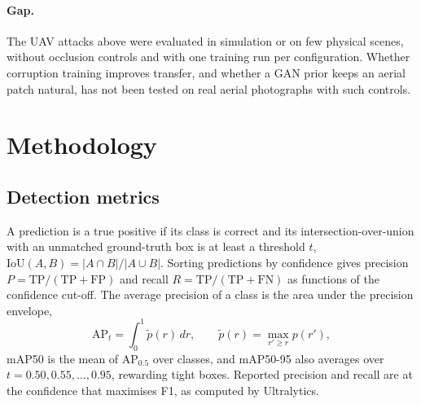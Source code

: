 \documentclass[11pt,a4paper]{article}
\begin{document}
\paragraph{Gap.} The UAV attacks above were evaluated in simulation or on few physical scenes, without occlusion controls and with one training run per configuration. Whether corruption training improves transfer, and whether a GAN prior keeps an aerial patch natural, has not been tested on real aerial photographs with such controls.

\section{Methodology}\label{sec:method}

\subsection{Detection metrics}\label{sec:metrics}
A prediction is a true positive if its class is correct and its intersection-over-union with an unmatched ground-truth box is at least a threshold $t$, $\mathrm{IoU}(A,B)=|A\cap B|/|A\cup B|$. Sorting predictions by confidence gives precision $P=\mathrm{TP}/(\mathrm{TP}+\mathrm{FP})$ and recall $R=\mathrm{TP}/(\mathrm{TP}+\mathrm{FN})$ as functions of the confidence cut-off. The average precision of a class is the area under the precision envelope,
\begin{equation}
\mathrm{AP}_t=\int_0^1\tilde p(r)\,dr,\qquad \tilde p(r)=\max_{r'\ge r}p(r'),
\end{equation}
mAP50 is the mean of $\mathrm{AP}_{0.5}$ over classes, and mAP50-95 also averages over $t=0.50,0.55,\dots,0.95$, rewarding tight boxes. Reported precision and recall are at the confidence that maximises F1, as computed by Ultralytics.
\end{document}
